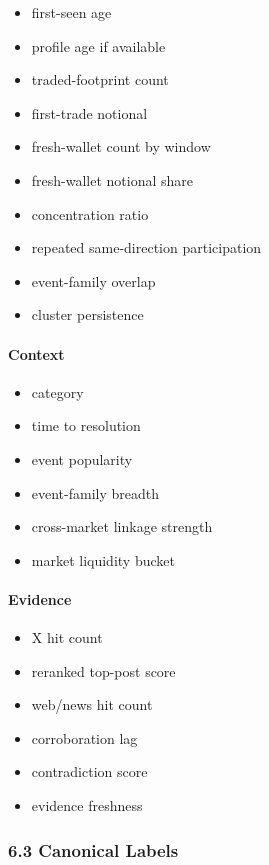\documentclass[
]{article}
\providecommand{\tightlist}{%
  \setlength{\itemsep}{0pt}\setlength{\parskip}{0pt}}
\begin{document}
\begin{itemize}
\tightlist
\item
  first-seen age
\item
  profile age if available
\item
  traded-footprint count
\item
  first-trade notional
\item
  fresh-wallet count by window
\item
  fresh-wallet notional share
\item
  concentration ratio
\item
  repeated same-direction participation
\item
  event-family overlap
\item
  cluster persistence
\end{itemize}

\paragraph{Context}\label{context}

\begin{itemize}
\tightlist
\item
  category
\item
  time to resolution
\item
  event popularity
\item
  event-family breadth
\item
  cross-market linkage strength
\item
  market liquidity bucket
\end{itemize}

\paragraph{Evidence}\label{evidence}

\begin{itemize}
\tightlist
\item
  X hit count
\item
  reranked top-post score
\item
  web/news hit count
\item
  corroboration lag
\item
  contradiction score
\item
  evidence freshness
\end{itemize}

\subsubsection{6.3 Canonical Labels}\label{63-canonical-labels}
\end{document}
